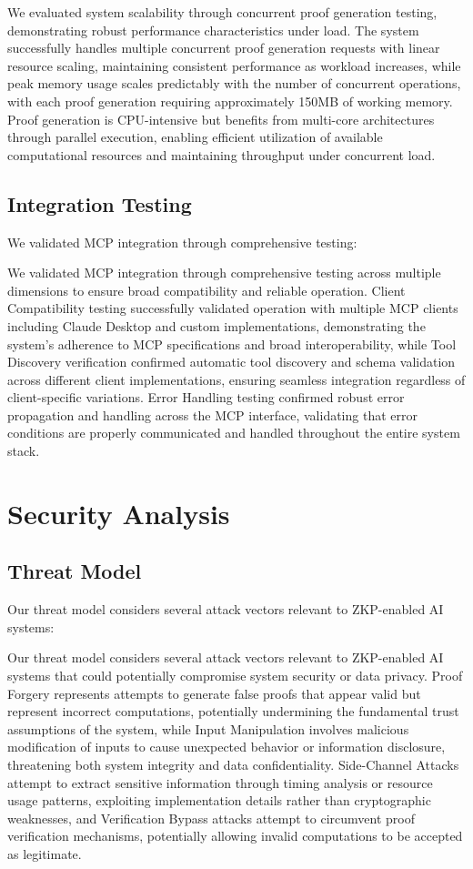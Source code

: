 \documentclass[11pt]{article}
\begin{document}
We evaluated system scalability through concurrent proof generation testing, demonstrating robust performance characteristics under load. The system successfully handles multiple concurrent proof generation requests with linear resource scaling, maintaining consistent performance as workload increases, while peak memory usage scales predictably with the number of concurrent operations, with each proof generation requiring approximately 150MB of working memory. Proof generation is CPU-intensive but benefits from multi-core architectures through parallel execution, enabling efficient utilization of available computational resources and maintaining throughput under concurrent load.

\subsection{Integration Testing}

We validated MCP integration through comprehensive testing:

We validated MCP integration through comprehensive testing across multiple dimensions to ensure broad compatibility and reliable operation. Client Compatibility testing successfully validated operation with multiple MCP clients including Claude Desktop and custom implementations, demonstrating the system's adherence to MCP specifications and broad interoperability, while Tool Discovery verification confirmed automatic tool discovery and schema validation across different client implementations, ensuring seamless integration regardless of client-specific variations. Error Handling testing confirmed robust error propagation and handling across the MCP interface, validating that error conditions are properly communicated and handled throughout the entire system stack.

\section{Security Analysis}
\label{sec:security}

\subsection{Threat Model}

Our threat model considers several attack vectors relevant to ZKP-enabled AI systems:

Our threat model considers several attack vectors relevant to ZKP-enabled AI systems that could potentially compromise system security or data privacy. Proof Forgery represents attempts to generate false proofs that appear valid but represent incorrect computations, potentially undermining the fundamental trust assumptions of the system, while Input Manipulation involves malicious modification of inputs to cause unexpected behavior or information disclosure, threatening both system integrity and data confidentiality. Side-Channel Attacks attempt to extract sensitive information through timing analysis or resource usage patterns, exploiting implementation details rather than cryptographic weaknesses, and Verification Bypass attacks attempt to circumvent proof verification mechanisms, potentially allowing invalid computations to be accepted as legitimate.
\end{document}
